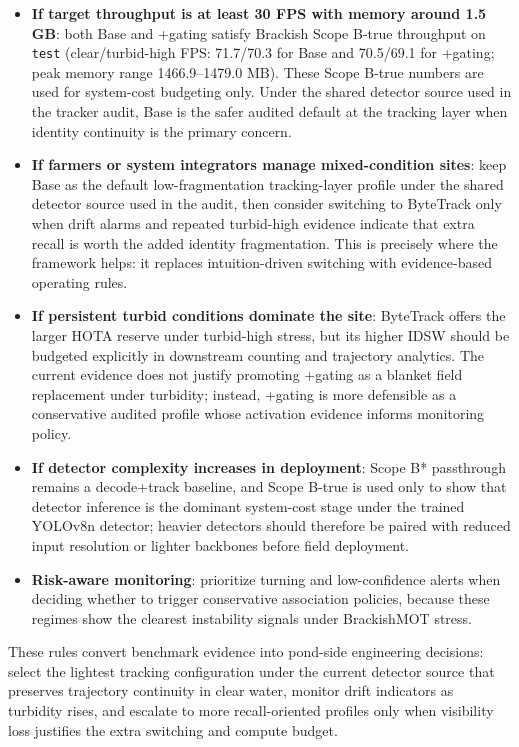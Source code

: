 \documentclass[5p,twocolumn,a4paper]{elsarticle}
\begin{document}
\begin{itemize}
  \item \textbf{If target throughput is at least 30 FPS with memory around 1.5 GB}: both Base and +gating satisfy Brackish Scope B-true throughput on \texttt{test} (clear/turbid-high FPS: 71.7/70.3 for Base and 70.5/69.1 for +gating; peak memory range 1466.9--1479.0 MB). These Scope B-true numbers are used for system-cost budgeting only. Under the shared detector source used in the tracker audit, Base is the safer audited default at the tracking layer when identity continuity is the primary concern.
  \item \textbf{If farmers or system integrators manage mixed-condition sites}: keep Base as the default low-fragmentation tracking-layer profile under the shared detector source used in the audit, then consider switching to ByteTrack only when drift alarms and repeated turbid-high evidence indicate that extra recall is worth the added identity fragmentation. This is precisely where the framework helps: it replaces intuition-driven switching with evidence-based operating rules.
  \item \textbf{If persistent turbid conditions dominate the site}: ByteTrack offers the larger HOTA reserve under turbid-high stress, but its higher IDSW should be budgeted explicitly in downstream counting and trajectory analytics. The current evidence does not justify promoting +gating as a blanket field replacement under turbidity; instead, +gating is more defensible as a conservative audited profile whose activation evidence informs monitoring policy.
  \item \textbf{If detector complexity increases in deployment}: Scope B* passthrough remains a decode+track baseline, and Scope B-true is used only to show that detector inference is the dominant system-cost stage under the trained YOLOv8n detector; heavier detectors should therefore be paired with reduced input resolution or lighter backbones before field deployment.
  \item \textbf{Risk-aware monitoring}: prioritize turning and low-confidence alerts when deciding whether to trigger conservative association policies, because these regimes show the clearest instability signals under BrackishMOT stress.
\end{itemize}

These rules convert benchmark evidence into pond-side engineering decisions: select the lightest tracking configuration under the current detector source that preserves trajectory continuity in clear water, monitor drift indicators as turbidity rises, and escalate to more recall-oriented profiles only when visibility loss justifies the extra switching and compute budget.
\end{document}
